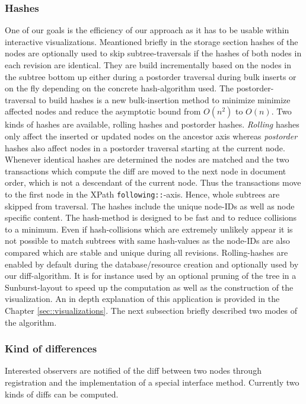 \subsubsection{Hashes} One of our goals is the efficiency of our approach as it has to be usable within interactive visualizations. Meantioned briefly in the storage section hashes of the nodes are optionally used to skip subtree-traversals if the hashes of both nodes in each revision are identical. They are build incrementally based on the nodes in the subtree bottom up either during a postorder traversal during bulk inserts or on the fly depending on the concrete hash-algorithm used. The postorder-traversal to build hashes is a new bulk-insertion method to minimize minimize affected nodes and reduce the asymptotic bound from $O(n^2)$ to $O(n)$. Two kinds of hashes are available, rolling hashes and postorder hashes. \emph{Rolling} hashes only affect the inserted or updated nodes on the ancestor axis whereas \emph{postorder} hashes also affect nodes in a postorder traversal starting at the current node. Whenever identical hashes are determined the nodes are matched and the two transactions which compute the diff are moved to the next node in document order, which is not a descendant of the current node. Thus the transactions move to the first node in the XPath \texttt{following::}-axis. Hence, whole subtrees are skipped from traversal. The hashes include the unique node-IDs as well as node specific content. The hash-method is designed to be fast and to reduce collisions to a minimum. Even if hash-collisions which are extremely unlikely appear it is not possible to match subtrees with same hash-values as the node-IDs are also compared which are stable and unique during all revisions. Rolling-hashes are enabled by default during the database/resource creation and optionally used by our diff-algorithm. It is for instance used by an optional pruning of the tree in a Sunburst-layout to speed up the computation as well as the construction of the visualization. An in depth explanation of this application is provided in the Chapter \ref{sec::visualizations}. The next subsection briefly described two modes of the algorithm.

\subsubsection{Kind of differences} Interested observers are notified of the diff between two nodes through registration and the implementation of a special interface method. Currently two kinds of diffs can be computed.

